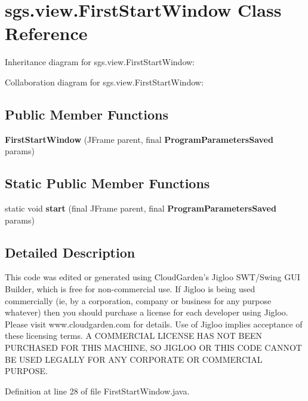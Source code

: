 \section{sgs.\-view.\-First\-Start\-Window Class Reference}
\label{classsgs_1_1view_1_1_first_start_window}


Inheritance diagram for sgs.\-view.\-First\-Start\-Window\-:


Collaboration diagram for sgs.\-view.\-First\-Start\-Window\-:
\subsection*{Public Member Functions}
\begin{DoxyCompactItemize}
\item 
{\bf First\-Start\-Window} (J\-Frame parent, final {\bf Program\-Parameters\-Saved} params)
\end{DoxyCompactItemize}
\subsection*{Static Public Member Functions}
\begin{DoxyCompactItemize}
\item 
static void {\bf start} (final J\-Frame parent, final {\bf Program\-Parameters\-Saved} params)
\end{DoxyCompactItemize}


\subsection{Detailed Description}
This code was edited or generated using Cloud\-Garden's Jigloo S\-W\-T/\-Swing G\-U\-I Builder, which is free for non-\/commercial use. If Jigloo is being used commercially (ie, by a corporation, company or business for any purpose whatever) then you should purchase a license for each developer using Jigloo. Please visit www.\-cloudgarden.\-com for details. Use of Jigloo implies acceptance of these licensing terms. A C\-O\-M\-M\-E\-R\-C\-I\-A\-L L\-I\-C\-E\-N\-S\-E H\-A\-S N\-O\-T B\-E\-E\-N P\-U\-R\-C\-H\-A\-S\-E\-D F\-O\-R T\-H\-I\-S M\-A\-C\-H\-I\-N\-E, S\-O J\-I\-G\-L\-O\-O O\-R T\-H\-I\-S C\-O\-D\-E C\-A\-N\-N\-O\-T B\-E U\-S\-E\-D L\-E\-G\-A\-L\-L\-Y F\-O\-R A\-N\-Y C\-O\-R\-P\-O\-R\-A\-T\-E O\-R C\-O\-M\-M\-E\-R\-C\-I\-A\-L P\-U\-R\-P\-O\-S\-E. 

Definition at line 28 of file First\-Start\-Window.\-java.



